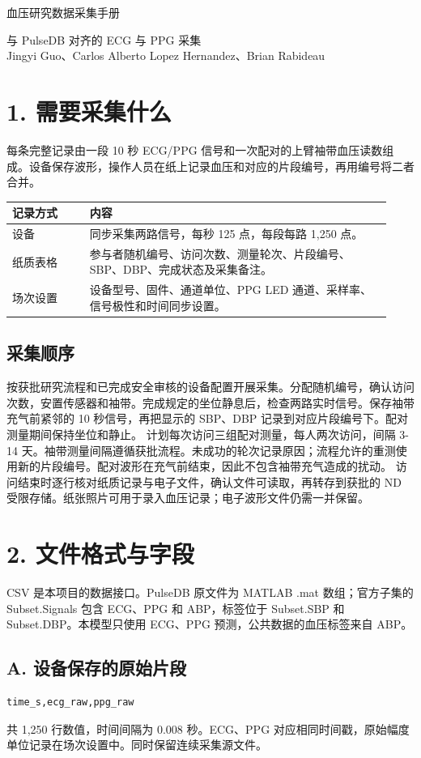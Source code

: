\documentclass[11pt,letterpaper]{article}
\begin{document}
{\sffamily\color{navy}\LARGE 血压研究数据采集手册\par}
与 PulseDB 对齐的 ECG 与 PPG 采集\\
Jingyi Guo、Carlos Alberto Lopez Hernandez、Brian Rabideau
\section*{1. 需要采集什么}
每条完整记录由一段 10 秒 ECG/PPG 信号和一次配对的上臂袖带血压读数组成。设备保存波形，操作人员在纸上记录血压和对应的片段编号，再用编号将二者合并。

\par\smallskip
\begin{tabular}{@{}p{0.19\linewidth}p{0.74\linewidth}@{}}\toprule
记录方式 & 内容\\\midrule
设备 & 同步采集两路信号，每秒 125 点，每段每路 1,250 点。\\
纸质表格 & 参与者随机编号、访问次数、测量轮次、片段编号、SBP、DBP、完成状态及采集备注。\\
场次设置 & 设备型号、固件、通道单位、PPG LED 通道、采样率、信号极性和时间同步设置。\\
\bottomrule\end{tabular}\par\smallskip
\subsection*{采集顺序}
按获批研究流程和已完成安全审核的设备配置开展采集。分配随机编号，确认访问次数，安置传感器和袖带。完成规定的坐位静息后，检查两路实时信号。保存袖带充气前紧邻的 10 秒信号，再把显示的 SBP、DBP 记录到对应片段编号下。配对测量期间保持坐位和静止。
计划每次访问三组配对测量，每人两次访问，间隔 3-14 天。袖带测量间隔遵循获批流程。未成功的轮次记录原因；流程允许的重测使用新的片段编号。配对波形在充气前结束，因此不包含袖带充气造成的扰动。
访问结束时逐行核对纸质记录与电子文件，确认文件可读取，再转存到获批的 ND 受限存储。纸张照片可用于录入血压记录；电子波形文件仍需一并保留。\newpage
\section*{2. 文件格式与字段}
CSV 是本项目的数据接口。PulseDB 原文件为 MATLAB .mat 数组；官方子集的 Subset.Signals 包含 ECG、PPG 和 ABP，标签位于 Subset.SBP 和 Subset.DBP。本模型只使用 ECG、PPG 预测，公共数据的血压标签来自 ABP。
\subsection*{A. 设备保存的原始片段}
\begin{verbatim}time_s,ecg_raw,ppg_raw\end{verbatim}
共 1,250 行数值，时间间隔为 0.008 秒。ECG、PPG 对应相同时间戳，原始幅度单位记录在场次设置中。同时保留连续采集源文件。
\end{document}
